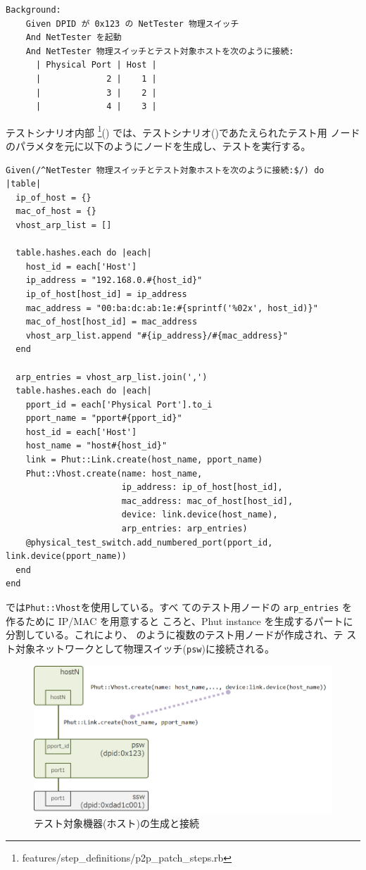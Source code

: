 \begin{lstlisting}[caption=テスト用ノードの生成,label=lst:create-testnode]
  Background:
    Given DPID が 0x123 の NetTester 物理スイッチ
    And NetTester を起動
    And NetTester 物理スイッチとテスト対象ホストを次のように接続:
      | Physical Port | Host |
      |             2 |    1 |
      |             3 |    2 |
      |             4 |    3 |
\end{lstlisting}

テストシナリオ内部
\footnote{features/step\_definitions/p2p\_patch\_steps.rb}()
では、テストシナリオ()であたえられたテスト用
ノードのパラメタを元に以下のようにノードを生成し、テストを実行する。

\begin{lstlisting}[caption=テスト用ノードの生成と操作,label=lst:operate-testnode]
Given(/^NetTester 物理スイッチとテスト対象ホストを次のように接続:$/) do |table|
  ip_of_host = {}
  mac_of_host = {}
  vhost_arp_list = []

  table.hashes.each do |each|
    host_id = each['Host']
    ip_address = "192.168.0.#{host_id}"
    ip_of_host[host_id] = ip_address
    mac_address = "00:ba:dc:ab:1e:#{sprintf('%02x', host_id)}"
    mac_of_host[host_id] = mac_address
    vhost_arp_list.append "#{ip_address}/#{mac_address}"
  end

  arp_entries = vhost_arp_list.join(',')
  table.hashes.each do |each|
    pport_id = each['Physical Port'].to_i
    pport_name = "pport#{pport_id}"
    host_id = each['Host']
    host_name = "host#{host_id}"
    link = Phut::Link.create(host_name, pport_name)
    Phut::Vhost.create(name: host_name,
                       ip_address: ip_of_host[host_id],
                       mac_address: mac_of_host[host_id],
                       device: link.device(host_name),
                       arp_entries: arp_entries)
    @physical_test_switch.add_numbered_port(pport_id, link.device(pport_name))
  end
end
\end{lstlisting}

では\verb|Phut::Vhost|を使用している。すべ
てのテスト用ノードの \verb|arp_entries| を作るために IP/MAC を用意すると
ころと、Phut instance を生成するパートに分割している。これにより、
のように複数のテスト用ノードが作成され、テ
スト対象ネットワークとして物理スイッチ(\verb|psw|)に接続される。

\begin{figure}[h]
 \centering
 \includegraphics[scale=0.6]{img/phut-testee-host.png}
 \caption{テスト対象機器(ホスト)の生成と接続}
 \label{fig:phut-testee-host}
\end{figure}


